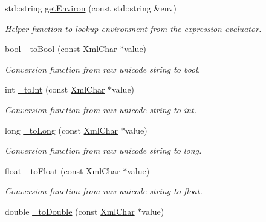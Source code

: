 \begin{DoxyCompactItemize}
std::string \hyperlink{namespace_d_d4hep_1_1_x_m_l_aed4e2c9933fc3d7c9fe92278ca5300a4}{getEnviron} (const std::string \&env)
\begin{DoxyCompactList}\small\item\em Helper function to lookup environment from the expression evaluator. \item\end{DoxyCompactList}\item 
bool \hyperlink{group___d_d4_h_e_p___x_m_l_ga4f06ff5f1ca607223cda870587170546}{\_\-toBool} (const \hyperlink{namespace_d_d4hep_1_1_x_m_l_a09e5d9cc86ed782f6826dfe0778c1815}{XmlChar} $\ast$value)
\begin{DoxyCompactList}\small\item\em Conversion function from raw unicode string to bool. \item\end{DoxyCompactList}\item 
int \hyperlink{group___d_d4_h_e_p___x_m_l_ga8b2fbc55c4631087c0c5e905327f04d0}{\_\-toInt} (const \hyperlink{namespace_d_d4hep_1_1_x_m_l_a09e5d9cc86ed782f6826dfe0778c1815}{XmlChar} $\ast$value)
\begin{DoxyCompactList}\small\item\em Conversion function from raw unicode string to int. \item\end{DoxyCompactList}\item 
long \hyperlink{group___d_d4_h_e_p___x_m_l_ga0da6cdd75009487075f485c74a034a7b}{\_\-toLong} (const \hyperlink{namespace_d_d4hep_1_1_x_m_l_a09e5d9cc86ed782f6826dfe0778c1815}{XmlChar} $\ast$value)
\begin{DoxyCompactList}\small\item\em Conversion function from raw unicode string to long. \item\end{DoxyCompactList}\item 
float \hyperlink{group___d_d4_h_e_p___x_m_l_ga74d0ba6278b3baa645887da2151279ee}{\_\-toFloat} (const \hyperlink{namespace_d_d4hep_1_1_x_m_l_a09e5d9cc86ed782f6826dfe0778c1815}{XmlChar} $\ast$value)
\begin{DoxyCompactList}\small\item\em Conversion function from raw unicode string to float. \item\end{DoxyCompactList}\item 
double \hyperlink{group___d_d4_h_e_p___x_m_l_gace8029e843a4c94cf50bd9adc32cd6f6}{\_\-toDouble} (const \hyperlink{namespace_d_d4hep_1_1_x_m_l_a09e5d9cc86ed782f6826dfe0778c1815}{XmlChar} $\ast$value)

\end{DoxyCompactItemize}
